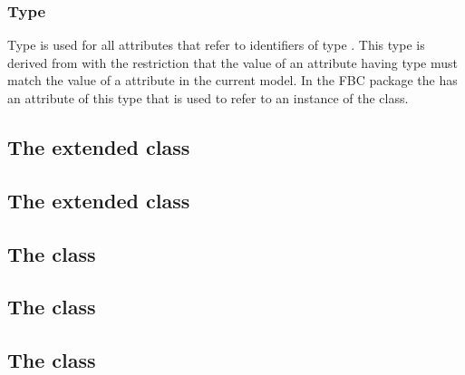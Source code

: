 \subsubsection{Type }
\label{primtype-fbcsidref}

Type  is used for all attributes that refer to
identifiers of type .  This type is derived from
 with the restriction that the value of an
attribute having type  must match the value of a
 attribute in the current model. In the FBC package the \ListOfObjectives has an attribute of this type that is used to refer to an instance of the \Objective class.

\subsection{The extended  class}
\label{sbml-model}
\label{listoffluxbounds-class}
\label{listofobjectives-class}


\subsection{The extended  class}
\label{sbml-species}
\label{species-class}


\subsection{The  class}
\label{fluxbound-class}


\subsection{The  class}
\label{objective-class}
\label{listoffluxobjectives-class}


\subsection{The  class}
\label{fluxobjective-class}


